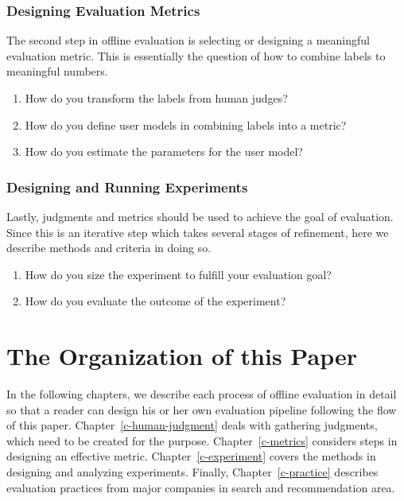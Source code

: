 \documentclass[openany]{now} %
\begin{document}
\subsubsection{Designing Evaluation Metrics}

The second step in offline evaluation is selecting or designing a meaningful evaluation metric. This is essentially the question of how to combine labels to meaningful numbers.

\begin{enumerate}
	\item How do you transform the labels from human judges?
	\item How do you define user models in combining labels into a metric?
	\item How do you estimate the parameters for the user model?
\end{enumerate}

\subsubsection{Designing and Running Experiments}

Lastly, judgments and metrics should be used to achieve the goal of evaluation. Since this is an iterative step which takes several stages of refinement, here we describe methods and criteria in doing so. 

\begin{enumerate}
	\item How do you size the experiment to fulfill your evaluation goal?
	\item How do you evaluate the outcome of the experiment?
\end{enumerate}


\section{The Organization of this Paper}

In the following chapters, we describe each process of offline evaluation in detail so that a reader can design his or her own evaluation pipeline following the flow of this paper. Chapter~\ref{c-human-judgment} deals with gathering judgments, which need to be created for the purpose. Chapter~\ref{c-metrics} considers steps in designing an effective metric. Chapter~\ref{c-experiment} covers the methods in designing and analyzing experiments. Finally, Chapter~\ref{c-practice} describes evaluation practices from major companies in search and recommendation area.
\end{document}
